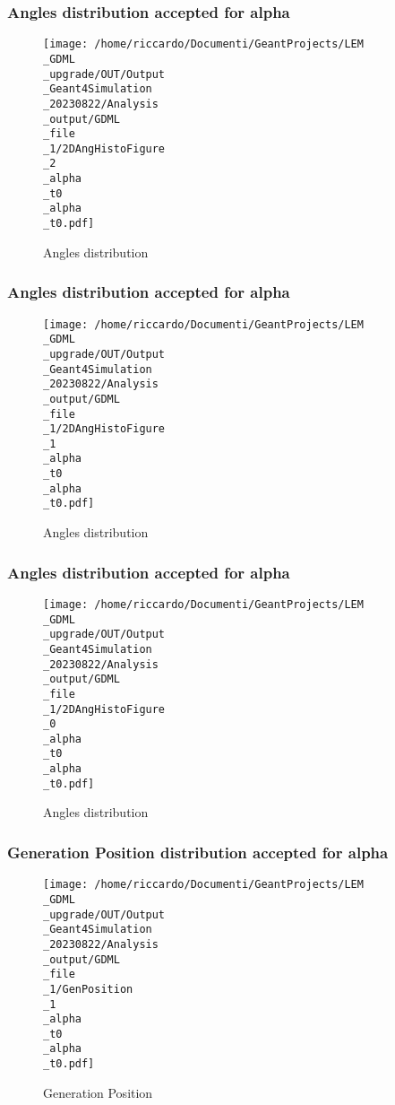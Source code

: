 \documentclass[8pt]{beamer}
\begin{document}
            \begin{frame}
                \frametitle{Angles distribution accepted for alpha}
            
        \begin{figure}[h]
            \centering
            \texttt{[image: /home/riccardo/Documenti/GeantProjects/LEM\\\_GDML\\\_upgrade/OUT/Output\\\_Geant4Simulation\\\_20230822/Analysis\\\_output/GDML\\\_file\\\_1/2DAngHistoFigure\\\_2\\\_alpha\\\_t0\\\_alpha\\\_t0.pdf]}
            \caption{Angles distribution}
        \end{figure}
        
            \end{frame}
            
            \begin{frame}
                \frametitle{Angles distribution accepted for alpha}
            
        \begin{figure}[h]
            \centering
            \texttt{[image: /home/riccardo/Documenti/GeantProjects/LEM\\\_GDML\\\_upgrade/OUT/Output\\\_Geant4Simulation\\\_20230822/Analysis\\\_output/GDML\\\_file\\\_1/2DAngHistoFigure\\\_1\\\_alpha\\\_t0\\\_alpha\\\_t0.pdf]}
            \caption{Angles distribution}
        \end{figure}
        
            \end{frame}
            
            \begin{frame}
                \frametitle{Angles distribution accepted for alpha}
            
        \begin{figure}[h]
            \centering
            \texttt{[image: /home/riccardo/Documenti/GeantProjects/LEM\\\_GDML\\\_upgrade/OUT/Output\\\_Geant4Simulation\\\_20230822/Analysis\\\_output/GDML\\\_file\\\_1/2DAngHistoFigure\\\_0\\\_alpha\\\_t0\\\_alpha\\\_t0.pdf]}
            \caption{Angles distribution}
        \end{figure}
        
            \end{frame}
            
            \begin{frame}
                \frametitle{Generation Position distribution accepted for alpha}
            
        \begin{figure}[h]
            \centering
            \texttt{[image: /home/riccardo/Documenti/GeantProjects/LEM\\\_GDML\\\_upgrade/OUT/Output\\\_Geant4Simulation\\\_20230822/Analysis\\\_output/GDML\\\_file\\\_1/GenPosition\\\_1\\\_alpha\\\_t0\\\_alpha\\\_t0.pdf]}
            \caption{Generation Position}
        \end{figure}
        
            \end{frame}
            
\end{document}
